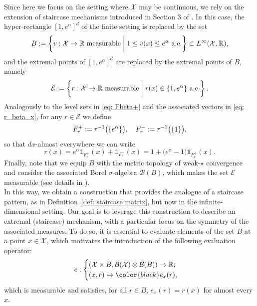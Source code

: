 \documentclass[a4paper, 11pt]{article}
\theoremstyle{definition}
\newcommand{\modar}{\color{black}}
\begin{document}
{Since here we focus on the setting where $\mathcal{X}$ may be continuous, we rely on the extension of staircase mechanisms introduced in Section 3 of \cite{amorino2025factorization}. In this case, the hyper-rectangle $[1, e^\alpha]^d$ of the finite setting is replaced by the set
\begin{equation}{\label{eq: set B}}
B := \left\{ v : \mathcal{X} \to \mathbb{R} \ \text{measurable} \;\bigg|\; 1 \le v(x) \le e^\alpha \ \text{a.e.} \right\} \subset L^\infty(\mathcal{X}, \mathbb{R}),
\end{equation}
and the extremal points of $[1, e^\alpha]^d$ are replaced by the extremal points of $B$, namely
\begin{equation}{\label{eq: set E}}
\mathcal{E} := \left\{ r : \mathcal{X} \to \mathbb{R} \ \text{measurable} \;\bigg|\; r(x) \in \{1, e^\alpha\} \ \text{a.e.} \right\}.
\end{equation}
Analogously to the level sets in \eqref{eq: Fbeta+} and the associated vectors in \eqref{eq: r_beta_x}, for any $r \in \mathcal{E}$ we define
\begin{equation}{\label{eq: Fr+ cont}}
F^+_r := r^{-1}\bigl(\{ e^\alpha \}\bigr), \quad
F^-_r := r^{-1}\bigl(\{ 1 \}\bigr),
\end{equation}
so that $dx$-almost everywhere we can write
\begin{equation}\label{eq: def r(x)}
    r(x) = e^\alpha \mathds{1}_{F^+_r}(x) + \mathds{1}_{F^-_r}(x)
    = 1 + \bigl(e^\alpha - 1\bigr) \mathds{1}_{F^+_r}(x).
\end{equation}
Finally, note that we equip $B$ {\modar with the metric topology of weak-$\star$ convergence and consider the associated Borel $\sigma$-algebra $\mathcal{B}(B)$, which makes the set $\mathcal{E}$ measurable (see details in \cite{amorino2025factorization}).}
\\
In this way, we obtain a construction that provides the analogue of a staircase pattern, as in Definition~\ref{def: staircase matrix}, but now in the infinite-dimensional setting. Our goal is to leverage this construction to describe an extremal (staircase) mechanism, with a particular focus on the symmetry of the associated measures. To do so, it is essential to evaluate elements of the set $B$ at a point $x \in \mathcal{X}$, which motivates the introduction of the following evaluation operator:
\[
e : 
\begin{cases}
(\mathcal{X} \times B, \mathcal{B}(\mathcal{X}) \otimes \mathcal{B}(B)) \to \mathbb{R}, \\
(x, r) \mapsto {\modar e_x(r),} 
\end{cases}
\]
{\modar which is }%
measurable and satisfies, {\modar for all $r\in B $,} $e_x(r) = r(x)$ for almost every $x$.  

}
\end{document}
